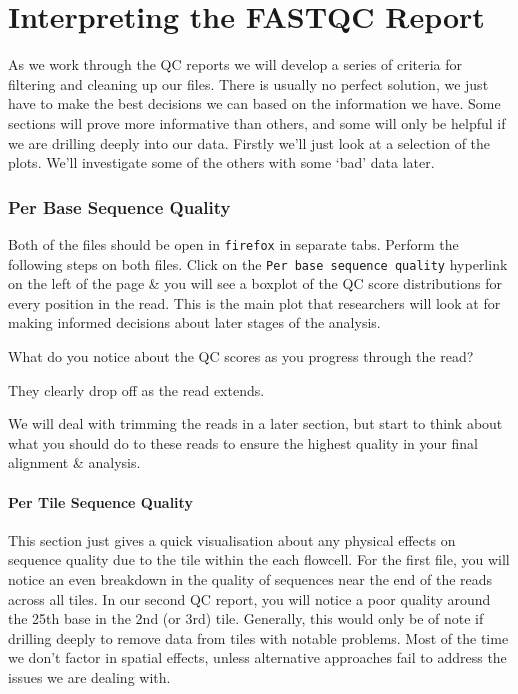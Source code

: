 \section{Interpreting the FASTQC Report}
\begin{note}
As we work through the QC reports we will develop a series of criteria for filtering and cleaning up our files.
There is usually no perfect solution, we just have to make the best decisions we can based on the information we have.
Some sections will prove more informative than others, and some will only be helpful if we are drilling deeply into our data.
Firstly we'll just look at a selection of the plots.
We'll investigate some of the others with some `bad' data later.
\end{note}

\subsubsection*{Per Base Sequence Quality}
\begin{steps}
Both of the files should be open in \texttt{firefox} in separate tabs.
Perform the following steps on both files.
Click on the \texttt{Per base sequence quality} hyperlink on the left of the page \& you will see a boxplot of the QC score distributions for every position in the read.
This is the main plot that researchers will look at for making informed decisions about later stages of the analysis.
\end{steps}

\begin{questions}
What do you notice about the QC scores as you progress through the read? \\
\begin{answer}
They clearly drop off as the read extends.\\
\end{answer} 
\end{questions}

We will deal with trimming the reads in a later section, but start to think about what you should do to these reads to ensure the highest quality in your final alignment \& analysis.

\paragraph{Per Tile Sequence Quality}
This section just gives a quick visualisation about any physical effects on sequence quality due to the tile within the each flowcell.
For the first file, you will notice an even breakdown in the quality of sequences near the end of the reads across all tiles.
In our second QC report, you will notice a poor quality around the 25th base in the 2nd (or 3rd) tile.
Generally, this would only be of note if drilling deeply to remove data from tiles with notable problems.
Most of the time we don't factor in spatial effects, unless alternative approaches fail to address the issues we are dealing with.

